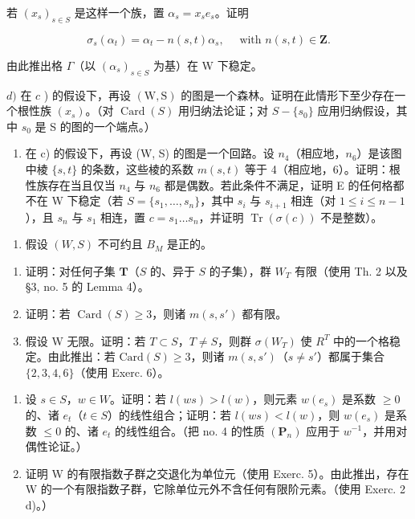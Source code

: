 若 \((x_{s})_{s\in S}\) 是这样一个族，置 \(\alpha_{s} = x_{s}e_{s}\)。证明

\[
\sigma_ {s} (\alpha_ {t}) = \alpha_ {t} - n (s, t) \alpha_ {s}, \quad \text { with } n (s, t) \in \mathbf {Z}.
\]

由此推出格 \(\Gamma\)（以 \((\alpha_s)_{s\in S}\) 为基）在 W 下稳定。

  \(d)\) 在 \(c\) ) 的假设下，再设 \((\mathrm{W},\mathrm{S})\) 的图是一个森林。证明在此情形下至少存在一个根性族 \((x_{s})\)。（对 \(\operatorname{Card}(S)\) 用归纳法论证；对 \(S - \{s_{0}\}\) 应用归纳假设，其中 \(s_{0}\) 是 S 的图的一个端点。）

\begin{enumerate}
\def\labelenumi{\alph{enumi})}
\setcounter{enumi}{4}
\tightlist
\item
  在 c) 的假设下，再设 (W, S) 的图是一个回路。设 \(n_{4}\)（相应地，\(n_{6}\)）是该图中棱 \(\{s, t\}\) 的条数，这些棱的系数 \(m(s, t)\) 等于 4（相应地，6）。证明：根性族存在当且仅当 \(n_{4}\) 与 \(n_{6}\) 都是偶数。若此条件不满足，证明 E 的任何格都不在 W 下稳定（若 \(S = \{s_{1}, \ldots, s_{n}\}\)，其中 \(s_{i}\) 与 \(s_{i+1}\) 相连（对 \(1 \leqslant i \leqslant n - 1\)），且 \(s_{n}\) 与 \(s_{1}\) 相连，置 \(c = s_{1} \ldots s_{n}\)，并证明 \(\operatorname{Tr}(\sigma(c))\) 不是整数）。
\end{enumerate}

\begin{enumerate}
\def\labelenumi{\arabic{enumi})}
\setcounter{enumi}{6}
\tightlist
\item
  假设 \((W, S)\) 不可约且 \(B_{M}\) 是正的。
\end{enumerate}

\begin{enumerate}
\def\labelenumi{\alph{enumi})}
\item
  证明：对任何子集 \(\mathbf{T}\)（\(S\) 的、异于 \(S\) 的子集），群 \(W_{T}\) 有限（使用 Th. 2 以及 §3, no. 5 的 Lemma 4）。
\item
  证明：若 \(\operatorname{Card}(S) \geqslant 3\)，则诸 \(m(s, s')\) 都有限。
\item
  假设 W 无限。证明：若 \(T \subset S\)，\(T \neq S\)，则群 \(\sigma(W_{T})\) 使 \(R^{T}\) 中的一个格稳定。由此推出：若 \(\text{Card}(S) \geqslant 3\)，则诸 \(m(s, s')\)（\(s \neq s'\)）都属于集合 \(\{2, 3, 4, 6\}\)（使用 Exerc. 6）。
\end{enumerate}

\begin{enumerate}
\def\labelenumi{\arabic{enumi})}
\setcounter{enumi}{7}
\item
  设 \(s \in S\)，\(w \in W\)。证明：若 \(l(ws) > l(w)\)，则元素 \(w(e_s)\) 是系数 \(\geqslant 0\) 的、诸 \(e_t\)（\(t \in S\)）的线性组合；证明：若 \(l(ws) < l(w)\)，则 \(w(e_s)\) 是系数 \(\leqslant 0\) 的、诸 \(e_t\) 的线性组合。（把 no. 4 的性质 \((\mathbf{P}_n)\) 应用于 \(w^{-1}\)，并用对偶性论证。）
\item
  证明 W 的有限指数子群之交退化为单位元（使用 Exerc. 5）。由此推出，存在 W 的一个有限指数子群，它除单位元外不含任何有限阶元素。（使用 Exerc. 2 d)。）
\end{enumerate}

